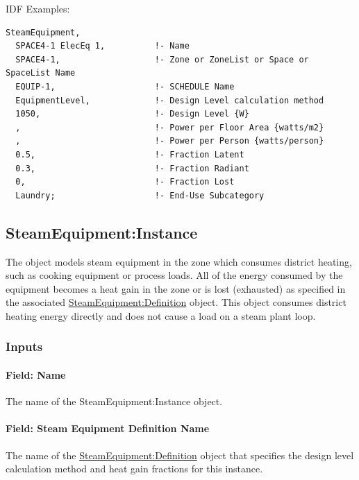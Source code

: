 IDF Examples:

\begin{lstlisting}
SteamEquipment,
  SPACE4-1 ElecEq 1,          !- Name
  SPACE4-1,                   !- Zone or ZoneList or Space or SpaceList Name
  EQUIP-1,                    !- SCHEDULE Name
  EquipmentLevel,             !- Design Level calculation method
  1050,                       !- Design Level {W}
  ,                           !- Power per Floor Area {watts/m2}
  ,                           !- Power per Person {watts/person}
  0.5,                        !- Fraction Latent
  0.3,                        !- Fraction Radiant
  0,                          !- Fraction Lost
  Laundry;                    !- End-Use Subcategory
\end{lstlisting}


\subsection{SteamEquipment:Instance}\label{steamequipmentinstance}

The object models steam equipment in the zone which consumes district heating, such as cooking equipment or process loads. All of the energy consumed by the equipment becomes a heat gain in the zone or is lost (exhausted) as specified in the associated \hyperref[steamequipmentdefinition]{SteamEquipment:Definition} object. This object consumes district heating energy directly and does not cause a load on a steam plant loop.

\subsubsection{Inputs}\label{inputs-6-012-steam-instance}

\paragraph{Field: Name}\label{field-name-6-009-steam-instance}

The name of the SteamEquipment:Instance object.

\paragraph{Field: Steam Equipment Definition Name}\label{field-steam-equipment-definition-name}

The name of the \hyperref[steamequipmentdefinition]{SteamEquipment:Definition} object that specifies the design level calculation method and heat gain fractions for this instance.

